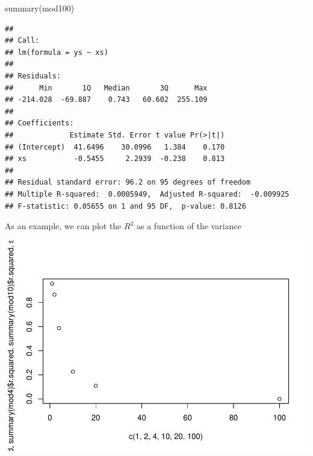 \documentclass[
]{book}
\newenvironment{Shaded}{\begin{snugshade}}{\end{snugshade}}
\newcommand{\DecValTok}[1]{\textcolor[rgb]{0.00,0.00,0.81}{#1}}
\newcommand{\FunctionTok}[1]{\textcolor[rgb]{0.00,0.00,0.00}{#1}}
\newcommand{\NormalTok}[1]{#1}
\newcommand{\SpecialCharTok}[1]{\textcolor[rgb]{0.00,0.00,0.00}{#1}}
\begin{document}
\begin{Shaded}
\begin{Highlighting}[]
\FunctionTok{summary}\NormalTok{(mod100)}
\end{Highlighting}
\end{Shaded}

\begin{verbatim}
## 
## Call:
## lm(formula = ys ~ xs)
## 
## Residuals:
##      Min       1Q   Median       3Q      Max 
## -214.028  -69.887    0.743   60.602  255.109 
## 
## Coefficients:
##             Estimate Std. Error t value Pr(>|t|)
## (Intercept)  41.6496    30.0996   1.384    0.170
## xs           -0.5455     2.2939  -0.238    0.813
## 
## Residual standard error: 96.2 on 95 degrees of freedom
## Multiple R-squared:  0.0005949,  Adjusted R-squared:  -0.009925 
## F-statistic: 0.05655 on 1 and 95 DF,  p-value: 0.8126
\end{verbatim}

As an example, we can plot the \(R^2\) as a function of the variance

\begin{Shaded}
\end{Shaded}

\includegraphics{ECOMODbook_files/figure-latex/a6.30-1.pdf}
\end{document}
